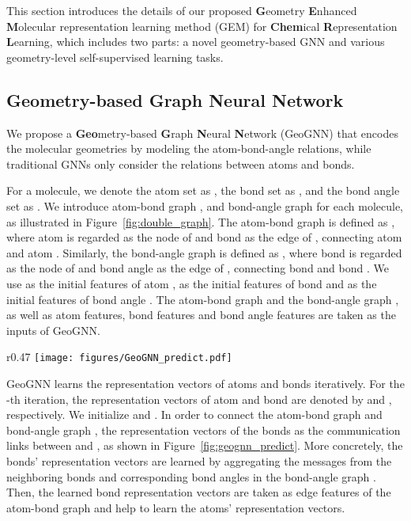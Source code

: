 \documentclass{article}
\begin{document}
This section introduces the details of our proposed \textbf{G}eometry \textbf{E}nhanced \textbf{M}olecular representation learning method (GEM) for \textbf{Chem}ical \textbf{R}epresentation \textbf{L}earning, which includes two parts: a novel geometry-based GNN and various geometry-level self-supervised learning tasks. 


\subsection{Geometry-based Graph Neural Network}
\label{Sec:geo_gnn}


We propose a \textbf{Geo}metry-based \textbf{G}raph \textbf{N}eural \textbf{N}etwork (GeoGNN) that encodes the molecular geometries by modeling the atom-bond-angle relations, while traditional GNNs only consider the relations between atoms and bonds.





For a molecule, we denote the atom set as , the bond set as , and the bond angle set as . We introduce atom-bond graph , and bond-angle graph  for each molecule, as illustrated in Figure~\ref{fig:double_graph}. The atom-bond graph is defined as , where atom  is regarded as the node of  and bond  as the edge of , connecting atom  and atom . Similarly, the bond-angle graph is defined as , where bond  is regarded as the node of  and bond angle  as the edge of , connecting bond  and bond . We use  as the initial features of atom ,  as the initial features of bond  and  as the initial features of bond angle .
The atom-bond graph  and the bond-angle graph , as well as atom features, bond features and bond angle features are taken as the inputs of GeoGNN.
\begin{wrapfigure}{r}{0.47\textwidth}
\centering
\texttt{[image: figures/GeoGNN\_predict.pdf]}
\caption{Overall architecture of GeoGNN}
\label{fig:geognn_predict}
\end{wrapfigure}

GeoGNN learns the representation vectors of atoms and bonds iteratively. For the -th iteration, the representation vectors of atom  and bond  are denoted by  and , respectively. We initialize  and . In order to connect the atom-bond graph  and bond-angle graph , the representation vectors of the bonds as the communication links between  and , as shown in Figure~\ref{fig:geognn_predict}. More concretely, the bonds' representation vectors are learned by aggregating the messages from the neighboring bonds and corresponding bond angles in the bond-angle graph . Then, the learned bond representation vectors are taken as edge features of the atom-bond graph  and help to learn the atoms' representation vectors.
\end{document}
